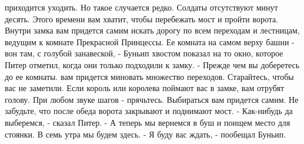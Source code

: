 приходится уходить. Но такое случается редко.
    Солдаты отсутствуют минут десять. Этого времени вам хватит, чтобы 
перебежать мост и пройти ворота. Внутри замка вам придется самим 
искать дорогу по всем переходам и лестницам, ведущим к комнате 
Прекрасной Принцессы.
    Ее комната на самом верху башни - вон там, с голубой занавеской, - 
Буньип хвостом показал на то окно, которое Питер отметил, когда они 
только подходили к замку.
    - Прежде чем вы доберетесь до ее комнаты. вам придется миновать 
множество переходов. Старайтесь, чтобы вас не заметили. Если король 
или королева поймают вас в замке, вам отрубят голову. При любом звуке 
шагов - прячьтесь. Выбираться вам придется самим. Не забудьте, что 
после обеда ворота закрывают и поднимают мост.
    - Как-нибудь да выберемся, - сказал Питер. - А теперь мы вернемся 
в буш и поищем место для стоянки. В семь утра мы будем здесь.
    - Я буду вас ждать, - пообещал Буньип.
